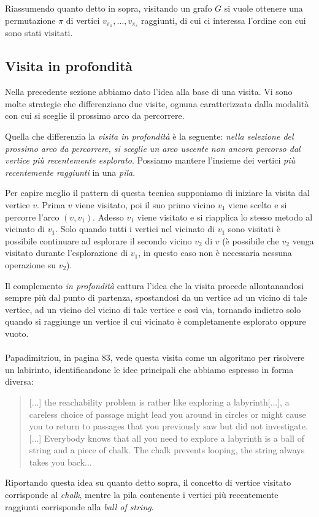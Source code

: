 Riassumendo quanto detto in sopra, visitando un grafo $G$ si vuole
ottenere una permutazione $\pi$ di vertici $v_{\pi_{1}}, \ldots,
v_{\pi_{s}}$ raggiunti, di cui ci interessa l'ordine con cui sono
stati visitati.

\subsection{Visita in profondit\`a}
Nella precedente sezione abbiamo dato l'idea alla base di una
visita. Vi sono molte strategie che differenziano due visite, ognuna
caratterizzata dalla modalit\`a con cui si sceglie il prossimo arco da
percorrere.

Quella che differenzia la \emph{visita in profondit\`a} \`e la
seguente: \emph{nella selezione del prossimo arco da percorrere, si
  sceglie un arco uscente non ancora percorso dal vertice pi\`u
  recentemente esplorato}.  Possiamo mantere l'insieme dei vertici
\emph{pi\`u recentemente raggiunti} in una \emph{pila}.

Per capire meglio il pattern di questa tecnica supponiamo di iniziare
la visita dal vertice $v$. Prima $v$ viene visitato, poi il suo primo
vicino $v_{1}$ viene scelto e si percorre l'arco $(v, v_{1})$. Adesso
$v_{1}$ viene visitato e si riapplica lo stesso metodo al vicinato di
$v_{1}$. Solo quando tutti i vertici nel vicinato di $v_{1}$ sono
visitati \`e possibile continuare ad esplorare il secondo vicino
$v_{2}$ di $v$ (\`e possibile che $v_{2}$ venga visitato durante
l'esplorazione di $v_{1}$, in questo caso non \`e necessaria nessuna
operazione su $v_{2}$).

Il complemento \emph{in profondit\`a} cattura l'idea che la visita
procede allontanandosi sempre pi\`u dal punto di partenza, spostandosi
da un vertice ad un vicino di tale vertice, ad un vicino del vicino di
tale vertice e cos\`i via, tornando indietro solo quando si raggiunge
un vertice il cui vicinato \`e completamente esplorato oppure vuoto.
\\\\
Papadimitriou, in \cite{Algorithms} pagina 83, vede questa visita come
un algoritmo per risolvere un labirinto, identificandone le idee
principali che abbiamo espresso in forma diversa:

\begin{quotation}
  [...] the reachability problem is rather like exploring a
  labyrinth[...], a careless choice of passage might lead you around
  in circles or might cause you to return to passages that you
  previously saw but did not investigate.[...] Everybody knows that
  all you need to explore a labyrinth is a ball of string and a piece
  of chalk. The chalk prevents looping, the string always takes you
  back...
\end{quotation}
Riportando questa idea su quanto detto sopra, il concetto di vertice
visitato corrisponde al \emph{chalk}, mentre la pila contenente i
vertici pi\`u recentemente raggiunti corrisponde alla \emph{ball of
  string}.

